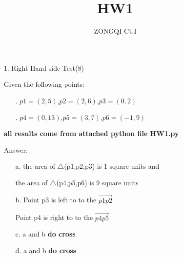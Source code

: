 \documentclass[12pt,letterpaper]{article}
\title{HW1}
\author{ZONGQI CUI}
\begin{document}
    \begin{itemize}
        \item [1.] Right-Hand-side Test(8)\par
                Given the following points:\par
            \begin{itemize}
                \item[.] $p1=(2,5)$,$p2=(2,6)$,$p3=(0,2)$
                \item[.] $p4=(0,13)$,$p5=(3,7)$,$p6=(-1,9)$
            \end{itemize}
            \textbf{all results come from attached python file HW1.py}\par
            Answer:\par
            \begin{itemize}
                \item[a.]
                    the area of $\bigtriangleup$(p1,p2,p3) is 1 square units and\par the area of $\bigtriangleup$(p4,p5,p6) is 9 square units
                \item[b.]
                    Point p3 is left to to the $\overrightarrow{p1p2}$\par
                    Point p4 is right to to the $\overrightarrow{p4p5}$
                \item[c.]
                    a and b \textbf{do cross}
                \item[d.]   
                    a and b \textbf{do cross}
            \end{itemize}
    \end{itemize}
\end{document}
